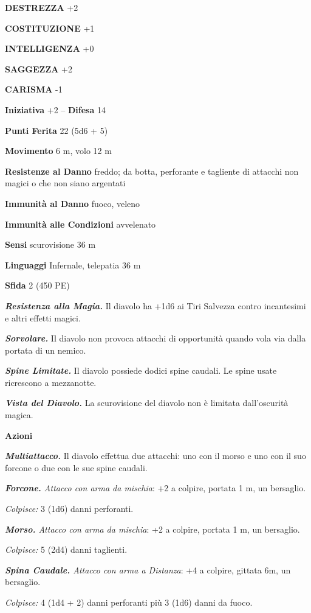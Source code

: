 \begin{multicols}{2}
\textbf{DESTREZZA} +2

\textbf{COSTITUZIONE} +1

\textbf{INTELLIGENZA} +0

\textbf{SAGGEZZA} +2

\textbf{CARISMA} -1

\textbf{Iniziativa} +2 -- \textbf{Difesa} 14

\textbf{Punti Ferita} 22 (5d6 + 5)

\textbf{Movimento} 6 m, volo 12 m

\textbf{Resistenze al Danno} freddo; da botta, perforante e tagliente di attacchi non magici o che non siano argentati

\textbf{Immunità al Danno} fuoco, veleno

\textbf{Immunità alle Condizioni} avvelenato

\textbf{Sensi} scurovisione 36 m

\textbf{Linguaggi} Infernale, telepatia 36 m

\textbf{Sfida} 2 (450 PE)

\emph{\textbf{Resistenza alla Magia.}} Il diavolo ha +1d6 ai Tiri Salvezza contro incantesimi e altri effetti magici.

\emph{\textbf{Sorvolare.}} Il diavolo non provoca attacchi di opportunità quando vola via dalla portata di un nemico.

\emph{\textbf{Spine Limitate.}} Il diavolo possiede dodici spine caudali. Le spine usate ricrescono a mezzanotte.

\emph{\textbf{Vista del Diavolo.}} La scurovisione del diavolo non è limitata dall'oscurità magica.

\textbf{Azioni}

\emph{\textbf{Multiattacco.}} Il diavolo effettua due attacchi: uno con il morso e uno con il suo forcone o due con le sue spine caudali.

\emph{\textbf{Forcone.} Attacco con arma da mischia}: +2 a colpire, portata 1 m, un bersaglio.

\emph{Colpisce:} 3 (1d6) danni perforanti.

\emph{\textbf{Morso.} Attacco con arma da mischia}: +2 a colpire, portata 1 m, un bersaglio.

\emph{Colpisce:} 5 (2d4) danni taglienti.

\emph{\textbf{Spina Caudale.} Attacco con arma a Distanza}: +4 a colpire, gittata 6m, un bersaglio.

\emph{Colpisce:} 4 (1d4 + 2) danni perforanti più 3 (1d6) danni da fuoco.


\end{multicols}
